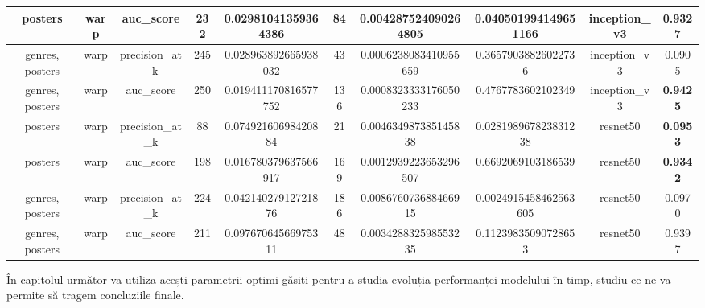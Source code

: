 \begin{table}
{\begin{tabular}{|c|c|c|c|c|c|c|c|c|c|}
\hline
posters                            & warp                            & auc\_score                          & 232             & 0.02981041359364386    & 84                     & 0.004287524090264805  & 0.040501994149651166  & inception\_v3                    & 0.9327                              \\ 
\hline
genres, posters                    & warp                            & precision\_at\_k                    & 245             & 0.028963892665938032   & 43                     & 0.0006238083410955659 & 0.36579038826022736   & inception\_v3                    & 0.0905                              \\ 
\hline
genres, posters                    & warp                            & auc\_score                          & 250             & 0.019411170816577752   & 136                    & 0.0008323333176050233 & 0.4767783602102349    & inception\_v3                    & \textbf{0.9425}                              \\ 
\hline
posters                            & warp                            & precision\_at\_k                    & 88              & 0.07492160698420884    & 21                     & 0.004634987385145838  & 0.028198967823831238  & resnet50                         & \textbf{0.0953}                              \\ 
\hline
posters                            & warp                            & auc\_score                          & 198             & 0.016780379637566917   & 169                    & 0.0012939223653296507 & 0.6692069103186539    & resnet50                         & \textbf{0.9342}                              \\ 
\hline
genres, posters                    & warp                            & precision\_at\_k                    & 224             & 0.04214027912721876    & 186                    & 0.008676073688466915  & 0.0024915458462563605 & resnet50                         & 0.0970                              \\ 
\hline
genres, posters                    & warp                            & auc\_score                          & 211             & 0.09767064566975311    & 48                     & 0.003428832598553235  & 0.11239835090728653   & resnet50                         & 0.9397                              \\
\hline
\end{tabular}}
\end{table}

În capitolul următor va utiliza acești parametrii optimi găsiți pentru a studia evoluția performanței modelului în timp, studiu ce ne va permite să tragem concluziile finale.